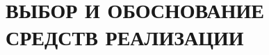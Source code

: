 \section[Выбор и обоснование средств реализации]{ВЫБОР И ОБОСНОВАНИЕ \\ СРЕДСТВ РЕАЛИЗАЦИИ}
\pagebreak
